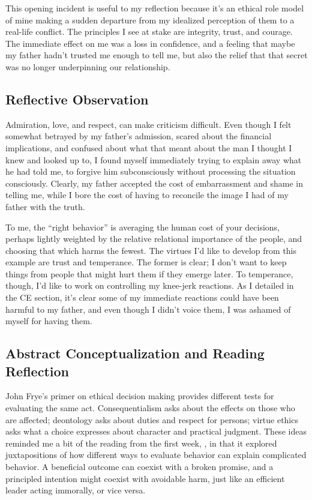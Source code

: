 \documentclass[12pt,stu,biblatex]{apa7}
\begin{document}
This opening incident is useful to my reflection because it's an ethical role model of mine making a sudden departure from my idealized perception of them to a real-life conflict.
The principles I see at stake are integrity, trust, and courage.
The immediate effect on me was a loss in confidence, and a feeling that maybe my father hadn't trusted me enough to tell me, but also the relief that that secret was no longer underpinning our relationship.
\subsection{Reflective Observation}
Admiration, love, and respect, can make criticism difficult.
Even though I felt somewhat betrayed by my father's admission, scared about the financial implications, and confused about what that meant about the man I thought I knew and looked up to, I found myself immediately trying to explain away what he had told me, to forgive him subconsciously without processing the situation consciously.
Clearly, my father accepted the cost of embarrassment and shame in telling me, while I bore the cost of having to reconcile the image I had of my father with the truth.

To me, the ``right behavior'' is averaging the human cost of your decisions, perhaps lightly weighted by the relative relational importance of the people, and choosing that which harms the fewest.
The virtues I'd like to develop from this example are trust and temperance.
The former is clear; I don't want to keep things from people that might hurt them if they emerge later.
To temperance, though, I'd like to work on controlling my knee-jerk reactions.
As I detailed in the CE section, it's clear some of my immediate reactions could have been harmful to my father, and even though I didn't voice them, I was ashamed of myself for having them.

\subsection{Abstract Conceptualization and Reading Reflection}
John Frye's primer on ethical decision making \parencite{fryeEthicalAnalysis} provides different tests for evaluating the same act.
Consequentialism asks about the effects on those who are affected; deontology asks about duties and respect for persons; virtue ethics asks what a choice expresses about character and practical judgment.
These ideas reminded me a bit of the reading from the first week, \parencite{wood2021goodbadevil}, in that it explored juxtapositions of how different ways to evaluate behavior can explain complicated behavior.
A beneficial outcome can coexist with a broken promise, and a principled intention might coexist with avoidable harm, just like an efficient leader acting immorally, or vice versa.
\end{document}

